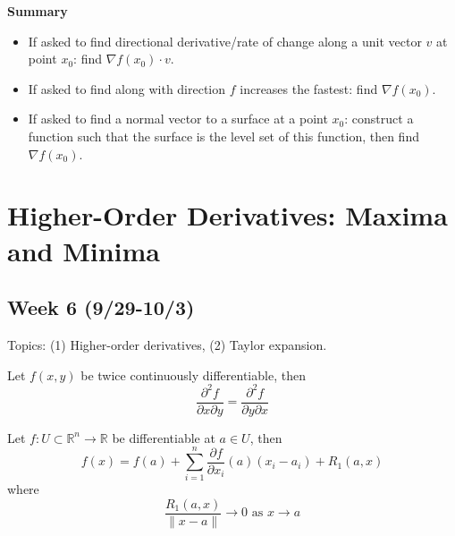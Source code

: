 \documentclass[openany]{book}
\newcommand{\R}{\mathbb{R}}
\begin{document}
\noindent 
\textbf{Summary}
\begin{itemize}
    \item If asked to find directional derivative/rate of change along a unit vector $v$ at point $x_0$: find $\nabla f(x_0)\cdot v$.
    \item If asked to find along with direction $f$ increases the fastest: find $\nabla f(x_0)$.
    \item If asked to find a normal vector to a surface at a point $x_0$: construct a function such that the surface is the level set of this function, then find $\nabla f(x_0)$.
\end{itemize}
 




\newpage 

\chapter{Higher-Order Derivatives: Maxima and Minima}
\section*{\centering Week 6 (9/29-10/3)}

\renewcommand\thesection{\arabic{section}}

\noindent
Topics: (1) Higher-order derivatives, (2) Taylor expansion.


\begin{prop}
    Let $f(x,y)$ be twice continuously differentiable, then 
    \begin{equation*}
        \frac{\partial^2 f}{\partial x\partial y}=\frac{\partial^2 f}{\partial y\partial x}
    \end{equation*}
\end{prop}


\begin{defn}
    Let $f:U\subset\R^n\to\R$ be differentiable at $a\in U$, then 
    \begin{equation*}
        f(x)=f(a)+\sum_{i=1}^n\frac{\partial f}{\partial x_i}(a)(x_i-a_i)+R_1(a,x)
    \end{equation*}
    where 
    \begin{equation*}
        \frac{R_1(a,x)}{\|x-a\|}\to 0 \text{ as } x\to a
    \end{equation*}
\end{defn}
\end{document}
